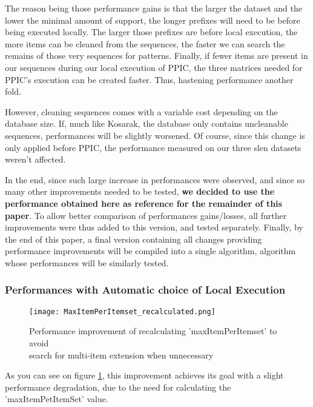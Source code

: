 \documentclass{eplmastersthesis}
\begin{document}
The reason being those performance gains is that the larger the dataset and the lower the minimal amount of support, the longer prefixes will need to be before being executed locally. The larger those prefixes are before local execution, the more items can be cleaned from the sequences, the faster we can search the remains of those very sequences for patterns. Finally, if fewer items are present in our sequences during our local execution of PPIC, the three matrices needed for PPIC's execution can be created faster. Thus, hastening performance another fold. \newline

However, cleaning sequences comes with a variable cost depending on the database size. If, much like Kosarak, the database only contains uncleanable sequences, performances will be slightly worsened. Of course, since this change is only applied before PPIC, the performance measured on our three slen datasets weren't affected. \newline

In the end, since such large increase in performances were observed, and since so many other improvements needed to be tested, \textbf{we decided to use the performance obtained here as reference for the remainder of this paper}. To allow better comparison of performances gains/losses, all further improvements were thus added to this version, and tested separately. Finally, by the end of this paper, a final version containing all changes providing performance improvements will be compiled into a single algorithm, algorithm whose performances will be similarly tested.

\subsubsection{Performances with Automatic choice of Local Execution}

\begin{figure}[h]
  \centering
  \texttt{[image: MaxItemPerItemset\_recalculated.png]}
  \caption[Automatic detection of item-sets type in dataset]{
		Performance improvement of recalculating 'maxItemPerItemset' to avoid \\
		search for multi-item extension when unnecessary
	\endtabular}
  \label{fig:maxItemPerItemset_recalculated}
\end{figure}

As you can see on figure \ref{fig:maxItemPerItemset_recalculated}, this improvement achieves its goal with a slight performance degradation, due to the need for calculating the 'maxItemPetItemSet' value. \newline
\end{document}
